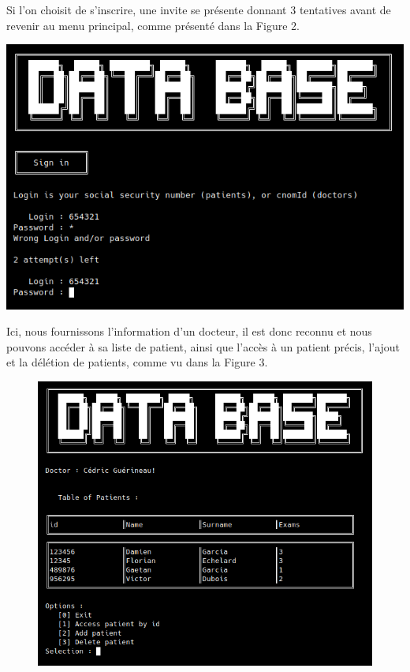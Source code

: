 \documentclass[12pt,a4paper]{article}
\newenvironment{Figure}
{\par\medskip\noindent\minipage{\linewidth}}
{\endminipage\par\medskip}
\begin{document}
\begin{multicols}{2}
Si l'on choisit de s'inscrire, une invite se présente donnant 3 tentatives avant de revenir au menu principal, comme présenté dans la Figure 2.
		

\begin{Figure}
	\centering
	\includegraphics[width=\linewidth]{images/walkthrough/sign_in.png}
	\label{fig:page_connexion}
\end{Figure}		

Ici, nous fournissons l'information d'un docteur, il est donc reconnu et nous pouvons accéder à sa liste de patient, ainsi que l'accès à un patient précis, l'ajout et la délétion de patients, comme vu dans la Figure 3.
			

\begin{figure}
	\centering
	\includegraphics[width=\linewidth]{images/walkthrough/doctor_main.png}
	\label{fig:menu_docteur}
\end{figure}
		

\end{multicols}
\end{document}
